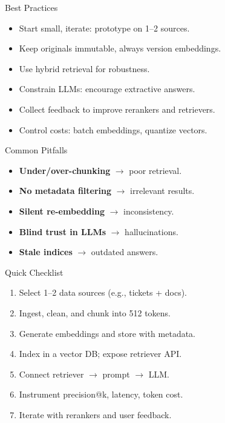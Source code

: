 \documentclass{beamer}
\begin{document}
\begin{frame}{Best Practices}
\begin{itemize}
    \item Start small, iterate: prototype on 1--2 sources.
    \item Keep originals immutable, always version embeddings.
    \item Use hybrid retrieval for robustness.
    \item Constrain LLMs: encourage extractive answers.
    \item Collect feedback to improve rerankers and retrievers.
    \item Control costs: batch embeddings, quantize vectors.
\end{itemize}
\end{frame}


\begin{frame}{Common Pitfalls}
\begin{itemize}
    \item \textbf{Under/over-chunking} $\rightarrow$ poor retrieval.
    \item \textbf{No metadata filtering} $\rightarrow$ irrelevant results.
    \item \textbf{Silent re-embedding} $\rightarrow$ inconsistency.
    \item \textbf{Blind trust in LLMs} $\rightarrow$ hallucinations.
    \item \textbf{Stale indices} $\rightarrow$ outdated answers.
\end{itemize}
\end{frame}


\begin{frame}{Quick Checklist}
\begin{enumerate}
    \item Select 1--2 data sources (e.g., tickets + docs).
    \item Ingest, clean, and chunk into 512 tokens.
    \item Generate embeddings and store with metadata.
    \item Index in a vector DB; expose retriever API.
    \item Connect retriever $\rightarrow$ prompt $\rightarrow$ LLM.
    \item Instrument precision@k, latency, token cost.
    \item Iterate with rerankers and user feedback.
\end{enumerate}
\end{frame}
\end{document}

